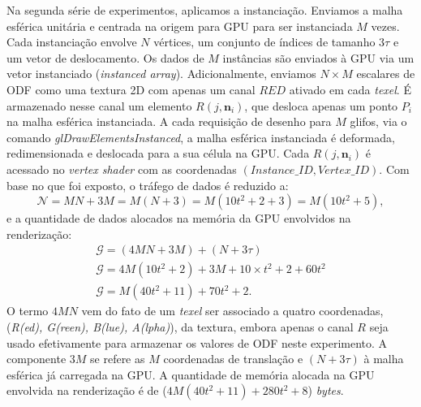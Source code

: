 Na segunda série de experimentos, aplicamos a instanciação. Enviamos a malha esférica unitária e centrada na origem para GPU para ser instanciada $M$ vezes. Cada instanciação envolve $N$ vértices, um conjunto de índices de tamanho $3\tau$ e um vetor de deslocamento. Os dados de $M$ instâncias são enviados à GPU via um vetor instanciado (\textit{instanced array}). Adicionalmente, enviamos $N\times M$ escalares de ODF como uma textura 2D com apenas um canal $RED$ ativado em cada \textit{texel}. É armazenado nesse canal um elemento $R(j, \mathbf{n}_i)$, que desloca apenas um ponto $P_i$ na malha esférica instanciada. A cada requisição de desenho para $M$ glifos, via o comando \textit{glDrawElementsInstanced},
a malha esférica instanciada é deformada, redimensionada e deslocada para a sua célula na GPU. Cada $R(j, \mathbf{n}_i)$ 
é acessado no \textit{vertex shader} com as coordenadas $(Instance\_ID, Vertex\_ID)$. Com base no que foi exposto, o tráfego de dados é reduzido a:
\begin{equation}
\label{eq::mem_odfs_trafego_2.1}
    \mathscr{N} =  MN + 3M = M(N+3) = M(10 t^2 + 2 + 3) = M(10t^2 + 5),
\end{equation}
e a quantidade de dados alocados na memória da GPU envolvidos na renderização:
\begin{equation}
\label{eq::mem_odfs_ocupancia_2.1}
\begin{array}{l}
    \mathscr{G} =  (4MN + 3M) + (N + 3\tau) \\
    \mathscr{G} = 4M(10t^2+2) + 3M + 10\times t^2 + 2 + 60t^2 \\
    \mathscr{G} = M(40t^2 + 11) + 70t^2 + 2 .
    \end{array}
\end{equation}
O termo $4MN$ vem do fato de um \textit{texel} ser associado a quatro coordenadas, (\textit{R(ed), G(reen), B(lue), A(lpha)}), da textura, embora apenas o canal $R$ seja usado efetivamente para armazenar os valores de ODF neste experimento. A componente $3M$ se refere as $M$ coordenadas de translação e $(N + 3\tau)$ à malha esférica já carregada na GPU. A quantidade de memória alocada na GPU envolvida na renderização é de ($4M(40t^2 + 11) + 280t^2 + 8$) \textit{bytes}.

